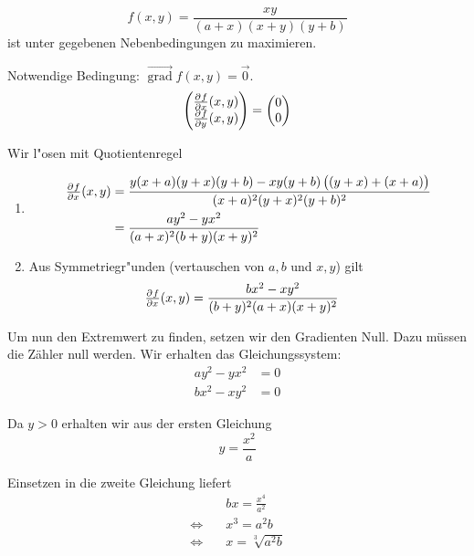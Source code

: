 \documentclass[a4paper,german,12pt,smallheadings]{scrartcl}
\begin{document}
  \begin{equation}
    f(x,y) = \frac{xy}{(a+x)(x+y)(y+b)}
  \end{equation}
  ist unter gegebenen Nebenbedingungen zu maximieren. %

  Notwendige Bedingung: $\vec{\operatorname{grad}} f(x,y) = \vec{0}$.
  \begin{equation}
    \begin{pmatrix}
      \pd{f}{x}(x,y) \\
      \pd{f}{y}(x,y)
    \end{pmatrix}
    =
  \begin{pmatrix} 0 \\ 0 \end{pmatrix}
  \end{equation}

  Wir l"osen mit Quotientenregel
  \begin{enumerate}[(1)]
    \item
      \begin{align*}
        \pd{f}{x}(x,y) &= \frac{y(x+a)(y+x)(y+b) - xy(y+b)\del{(y+x)+(x+a)}}{(x+a)^2(y+x)^2(y+b)^2} \\
                       &= \frac{ay^2 -yx^2}{(a+x)^2(b+y)(x+y)^2}
      \end{align*}
      \item
        Aus Symmetriegr"unden (vertauschen von $a,b$ und $x,y$) gilt
        \begin{align*}
        \pd{f}{x}(x,y) &= \frac{bx^2 -xy^2}{(b+y)^2(a+x)(x+y)^2}
        \end{align*}
  \end{enumerate}

  Um nun den Extremwert zu finden, setzen wir den Gradienten Null. Dazu müssen die Zähler null werden. Wir erhalten das Gleichungssystem:
  \begin{align*}
    ay^2 - yx^2 &= 0\\
    bx^2 - xy^2 &= 0
  \end{align*}

  Da $y > 0$ erhalten wir aus der ersten Gleichung
  \begin{equation*}
    y = \frac{x^2}{a}
  \end{equation*}

  Einsetzen in die zweite Gleichung liefert
  \begin{align*}
                         & bx = \frac{x^4}{a^2} \\
    \Leftrightarrow\quad & x^3 = a^2b \\
    \Leftrightarrow\quad & x   = \sqrt[3]{a^2b}
  \end{align*}
\end{document}
